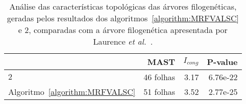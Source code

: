 \begin{table}[!htb]
  \caption{Análise das características topológicas das árvores filogenéticas, geradas pelos resultados dos algoritmos~\ref{algorithm:MRFVALSC} e $2$\SbRT{}, comparadas com a árvore filogenética apresentada por Laurence \textit {et al.}~\cite{cyanorak}.}
  \label{table:NRAGLYCG}
  \centering
  \begin{tabular}{|l|r|r|r|}
  \hline
                                     &                    MAST &              $I_{cong}$ &                 P-value \\ \hline
  $2$\SbRT{}                         &               46 folhas &                    3.17 &                6.76e-22 \\ \hline
  Algoritmo~\ref{algorithm:MRFVALSC} &               51 folhas &                    3.52 &                2.77e-25 \\ \hline
  \end{tabular}
\end{table}